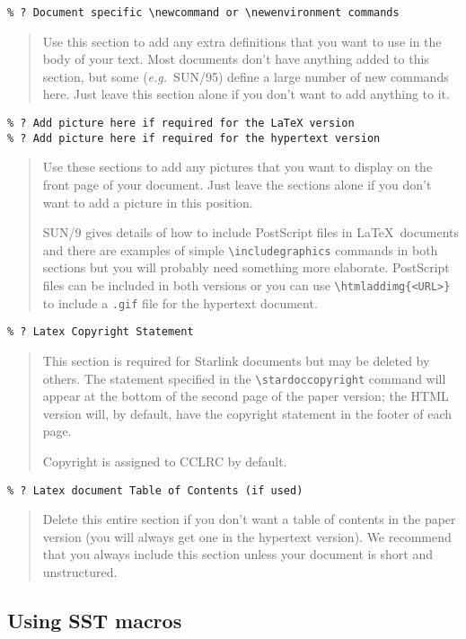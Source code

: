 \documentclass[twoside,11pt]{article}
\newcommand{\stardoccopyright} 
{Copyright \copyright\ 2000 Council for the Central Laboratory of the Research Councils}
\newcommand{\htmladdimg}[1]{}
\newcommand{\xref}[3]{#1}
\newcommand{\xlabel}[1]{}
\renewcommand{\_}{\texttt{\symbol{95}}}
\begin{document}
\verb+% ? Document specific \newcommand or \newenvironment commands+

\begin{quote}
Use this section to add any extra definitions that you want to use in the body
of your text.
Most documents don't have anything added to this section, but some
({\em{e.g.}}\ SUN/95) define a large number of new commands here.
Just leave this section alone if you don't want to add anything to it.
\end{quote}
\begin{verbatim}
% ? Add picture here if required for the LaTeX version
% ? Add picture here if required for the hypertext version
\end{verbatim}
\begin{quote}
Use these sections to add any pictures that you want to display on the front
page of your document.
Just leave the sections alone if you don't want to add a picture in this
position.

\xref{SUN/9}{sun9}{including_ps_in_latex}
gives details of how to include PostScript files in \LaTeX\ documents
and there are examples of simple \verb+\includegraphics+ commands in both
sections but you will probably need something more elaborate.
PostScript files can be included in both versions
or you can use \verb+\htmladdimg{<URL>}+ to include a \texttt{.gif} file for
the hypertext document.
\end{quote}

\verb+% ? Latex Copyright Statement+

\begin{quote}
This section is required for Starlink documents but may be deleted by others.
The statement specified in the \verb+\stardoccopyright+ command will appear at
the bottom of the second page of the paper version; the HTML version will, by
default, have the copyright statement in the footer of each page.

Copyright is assigned to CCLRC by default.
\end{quote}

\verb+% ? Latex document Table of Contents (if used)+

\begin{quote}
Delete this entire section if you don't want a table of contents in the paper
version (you will always get one in the hypertext version).
We recommend that you always include this section unless your document is short
and unstructured.
\end{quote}

\subsection{\xlabel{using_sst_macros}Using SST macros}
\end{document}
